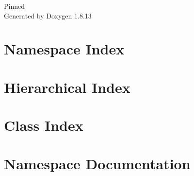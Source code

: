 \documentclass[twoside]{book}
\newcommand{\+}{\discretionary{\mbox{\scriptsize$\hookleftarrow$}}{}{}}
\newcommand{\clearemptydoublepage}{%
  \newpage{\pagestyle{empty}\cleardoublepage}%
}
\begin{document}
\hypersetup{pageanchor=false,
             bookmarksnumbered=true,
             pdfencoding=unicode
            }
\begin{titlepage}
\vspace*{7cm}
\begin{center}%
{\Large Pinned }\\
\vspace*{1cm}
{\large Generated by Doxygen 1.8.13}\\
\end{center}
\end{titlepage}
\clearemptydoublepage
{}
\tableofcontents
\clearemptydoublepage
{}
\hypersetup{pageanchor=true}

\chapter{Namespace Index}

\chapter{Hierarchical Index}

\chapter{Class Index}

\chapter{Namespace Documentation}



\end{document}
